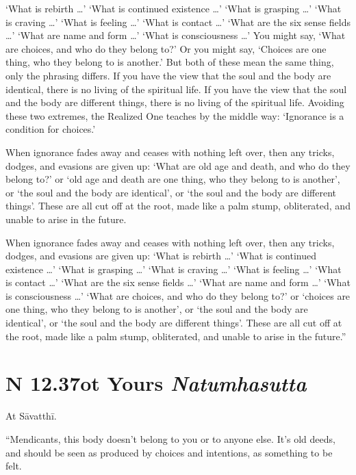 \documentclass[12pt,openany]{book}%
\newcommand*{\suttatitleacronym}[1]{\smaller[2]{#1}\vspace*{.3em}}
\newcommand*{\suttatitletranslation}[1]{\linebreak{#1}}
\newcommand*{\suttatitleroot}[1]{\linebreak\smaller[2]\itshape{#1}}
\newcommand*{\tocacronym}[1]{\hspace*{-3.3em}{#1}\quad}
\newcommand*{\toctranslation}[1]{#1}
\newcommand*{\tocroot}[1]{(\textit{#1})}
\begin{document}
‘What is rebirth …’ ‘What is continued existence …’ ‘What is grasping …’ ‘What is craving …’ ‘What is feeling …’ ‘What is contact …’ ‘What are the six sense fields …’ ‘What are name and form …’ ‘What is consciousness …’ You might say, ‘What are choices, and who do they belong to?’ Or you might say, ‘Choices are one thing, who they belong to is another.’ But both of these mean the same thing, only the phrasing differs. If you have the view that the soul and the body are identical, there is no living of the spiritual life. If you have the view that the soul and the body are different things, there is no living of the spiritual life. Avoiding these two extremes, the Realized One teaches by the middle way: ‘Ignorance is a condition for choices.’ 

When ignorance fades away and ceases with nothing left over, then any tricks, dodges, and evasions are given up: ‘What are old age and death, and who do they belong to?’ or ‘old age and death are one thing, who they belong to is another’, or ‘the soul and the body are identical’, or ‘the soul and the body are different things’. These are all cut off at the root, made like a palm stump, obliterated, and unable to arise in the future. 

When ignorance fades away and ceases with nothing left over, then any tricks, dodges, and evasions are given up: ‘What is rebirth …’ ‘What is continued existence …’ ‘What is grasping …’ ‘What is craving …’ ‘What is feeling …’ ‘What is contact …’ ‘What are the six sense fields …’ ‘What are name and form …’ ‘What is consciousness …’ ‘What are choices, and who do they belong to?’ or ‘choices are one thing, who they belong to is another’, or ‘the soul and the body are identical’, or ‘the soul and the body are different things’. These are all cut off at the root, made like a palm stump, obliterated, and unable to arise in the future.” 

%
\section*{{\suttatitleacronym SN 12.37}{\suttatitletranslation Not Yours }{\suttatitleroot Natumhasutta}}
\addcontentsline{toc}{section}{\tocacronym{SN 12.37} \toctranslation{Not Yours } \tocroot{Natumhasutta}}

At \textsanskrit{Sāvatthī}. 

“Mendicants, this body doesn’t belong to you or to anyone else. It’s old deeds, and should be seen as produced by choices and intentions, as something to be felt. 
\end{document}
